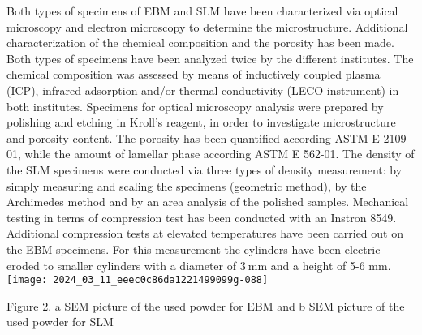 \documentclass[10pt]{article}
\begin{document}
Both types of specimens of EBM and SLM have been characterized via optical microscopy and electron microscopy to determine the microstructure. Additional characterization of the chemical composition and the porosity has been made. Both types of specimens have been analyzed twice by the different institutes. The chemical composition was assessed by means of inductively coupled plasma (ICP), infrared adsorption and/or thermal conductivity (LECO instrument) in both institutes. Specimens for optical microscopy analysis were prepared by polishing and etching in Kroll's reagent, in order to investigate microstructure and porosity content. The porosity has been quantified according ASTM E 2109-01, while the amount of lamellar phase according ASTM E 562-01. The density of the SLM specimens were conducted via three types of density measurement: by simply measuring and scaling the specimens (geometric method), by the Archimedes method and by an area analysis of the polished samples. Mechanical testing in terms of compression test has been conducted with an Instron 8549. Additional compression tests at elevated temperatures have been carried out on the EBM specimens. For this measurement the cylinders have been electric eroded to smaller cylinders with a diameter of $3 \mathrm{~mm}$ and a height of 5-6 $\mathrm{mm}$.\\
\texttt{[image: 2024\_03\_11\_eeec0c86da1221499099g-088]}

Figure 2. a SEM picture of the used powder for EBM and b SEM picture of the used powder for SLM
\end{document}
